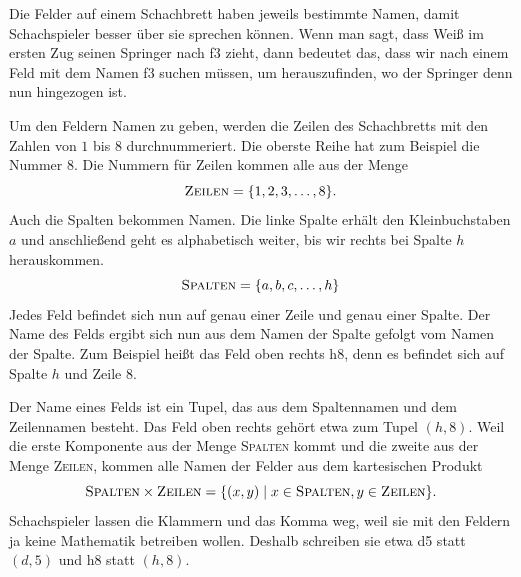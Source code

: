 \documentclass[../../main.tex]{subfiles}
\begin{document}
\begin{example}{}
    Die Felder auf einem Schachbrett haben jeweils bestimmte Namen, damit Schachspieler besser über sie sprechen können. Wenn man sagt, dass Weiß im ersten Zug seinen Springer nach f3 zieht, dann bedeutet das, dass wir nach einem Feld mit dem Namen f3 suchen müssen, um herauszufinden, wo der Springer denn nun hingezogen ist.

    Um den Feldern Namen zu geben, werden die Zeilen des Schachbretts mit den Zahlen von $1$ bis $8$ durchnummeriert. Die oberste Reihe hat zum Beispiel die Nummer $8$. Die Nummern für Zeilen kommen alle aus der Menge
    \[\textsc{Zeilen}=\{1,2,3,\dots,8\}.\]
    Auch die Spalten bekommen Namen. Die linke Spalte erhält den Kleinbuchstaben $a$ und anschließend geht es alphabetisch weiter, bis wir rechts bei Spalte $h$ herauskommen.
    \[\textsc{Spalten}=\{a,b,c,\dots,h\}\]
    Jedes Feld befindet sich nun auf genau einer Zeile und genau einer Spalte. Der Name des Felds ergibt sich nun aus dem Namen der Spalte gefolgt vom Namen der Spalte. Zum Beispiel heißt das Feld oben rechts h8, denn es befindet sich auf Spalte $h$ und Zeile 8.

    Der Name eines Felds ist ein Tupel, das aus dem Spaltennamen und dem Zeilennamen besteht. Das Feld oben rechts gehört etwa zum Tupel $(h,8)$. Weil die erste Komponente aus der Menge \textsc{Spalten} kommt und die zweite aus der Menge \textsc{Zeilen}, kommen alle Namen der Felder aus dem kartesischen Produkt \[\textsc{Spalten}\times\textsc{Zeilen}=\{(x,y)\mid x\in\textsc{Spalten},y\in\textsc{Zeilen}\}.\]
    Schachspieler lassen die Klammern und das Komma weg, weil sie mit den Feldern ja keine Mathematik betreiben wollen. Deshalb schreiben sie etwa d5 statt $(d,5)$ und h8 statt $(h,8)$.
\end{example}
\end{document}
